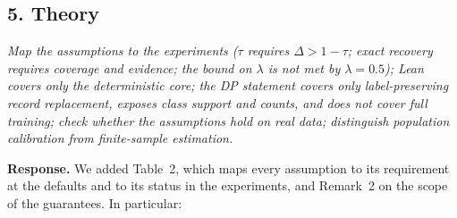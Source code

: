 \documentclass[11pt]{article}
\newenvironment{revcomment}{\par\medskip\noindent\begin{minipage}{\linewidth}\color{blue!45!black}\itshape}{\end{minipage}\par\smallskip}
\newcommand{\resp}{\par\noindent\textbf{Response.} }
\begin{document}
\subsection*{5. Theory}
\begin{revcomment}
Map the assumptions to the experiments ($\tau$ requires $\Delta>1-\tau$; exact recovery requires coverage and evidence; the bound on $\lambda$ is not met by $\lambda=0.5$); Lean covers only the deterministic core; the DP statement covers only label-preserving record replacement, exposes class support and counts, and does not cover full training; check whether the assumptions hold on real data; distinguish population calibration from finite-sample estimation.
\end{revcomment}
\resp We added Table~2, which maps every assumption to its requirement at the defaults and to its status in the experiments, and Remark~2 on the scope of the guarantees. In particular:
\end{document}
